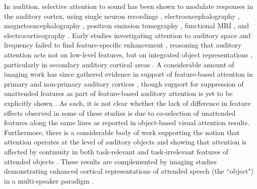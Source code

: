 \documentclass[9pt,twocolumn,twoside]{pnas-new}
\begin{document}
In audition, selective attention to sound has been shown to modulate responses in the auditory cortex, using single neuron recordings \cite{Fritz2003,Fritz2005}, electroencephalography \cite{Hillyard73a,Alain97a}, magnetoencephalography \cite{Woldorff93a}, positron emission tomography \cite{Zatorre99a}, functional MRI \cite{Grady97a,Jancke01a}, and electrocorticography \cite{Bidet-Caulet07a}. Early studies investigating attention to auditory space and frequency failed to find feature-specific enhancement \cite{Mondor98a,Zatorre99a,Petkov04a}, reasoning that auditory attention acts not on low-level features, but on integrated object representations \cite{Zatorre99a,Shinn-Cunningham08a,Hill10a}, particularly in secondary auditory cortical areas \cite{Petkov04a,Woods09a}. A considerable amount of imaging work has since gathered evidence in support of feature-based attention in primary and non-primary auditory cortices \cite{Ahveninen06a,Krumbholz07a,Altmann08a,Degerman08a,Paltoglou09a,Costa13a,Oh13a,Riecke17a}, though support for suppression of unattended features as part of feature-based auditory attention is yet to be explicitly shown  \cite{Paltoglou09a}. As such, it is not clear whether the lack of difference in feature effects observed in some of these studies \cite{Zatorre99a,Petkov04a,Woods09a,Hill10a} is due to co-selection of unattended features along the same lines as reported in object-based visual attention results. Furthermore, there is a considerable body of work supporting the notion that attention operates at the level of auditory objects and showing that attention is affected by continuity in both task-relevant and task-irrelevant features of attended objects \cite{Best08a,Maddox12a}. These results are complemented by imaging studies demonstrating enhanced cortical representations of attended speech (the ``object") in a multi-speaker paradigm \cite{Kerlin10a,Ding12a,Mesgarani12a,simon2015encoding}. 
\end{document}
